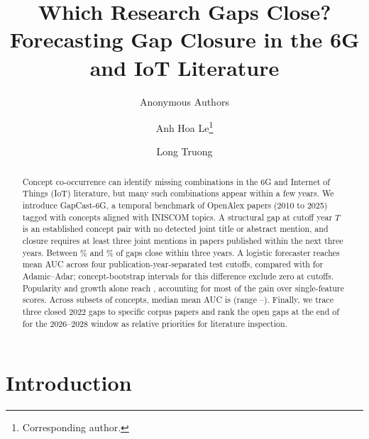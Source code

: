 \documentclass[runningheads]{llncs}
\newcommand{\bench}{GapCast-6G}
\begin{document}
\title{Which Research Gaps Close? Forecasting Gap Closure in the 6G and IoT Literature}

\ifdefined\anonymous
\author{Anonymous Authors}
\else
\author{Anh Hoa Le\thanks{Corresponding author.} \and Long Truong}
\fi

\maketitle

\ifdefined\anonymous
{}
\fi

\begin{abstract}
Concept co-occurrence can identify missing combinations in the 6G and Internet of Things (IoT) literature, but many such combinations appear within a few years. We introduce \bench{}, a temporal benchmark of \nWorks{} OpenAlex papers (2010 to 2025) tagged with \nConcepts{} concepts aligned with INISCOM topics. A structural gap at cutoff year $T$ is an established concept pair with no detected joint title or abstract mention, and closure requires at least three joint mentions in papers published within the next three years. Between \fillMin{}\% and \fillMax{}\% of gaps close within three years. A logistic forecaster reaches mean AUC \learnedAUC{} across four publication-year-separated test cutoffs, compared with \bestBaseAUC{} for Adamic--Adar; concept-bootstrap intervals for this difference exclude zero at \ciClAaExcludeW{} cutoffs. Popularity and growth alone reach \lrpgAUC{}, accounting for most of the gain over single-feature scores. Across \subN{} subsets of \subK{} concepts, median mean AUC is \subLearnedMed{} (range \subLearnedMin{}--\subLearnedMax{}). Finally, we trace three closed 2022 gaps to specific corpus papers and rank the open gaps at the end of \fcT{} for the 2026--2028 window as relative priorities for literature inspection.

\end{abstract}

\section{Introduction}
\end{document}
